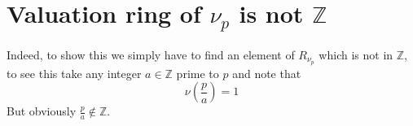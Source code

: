 \documentclass[11pt, a4paper]{article}
\begin{document}
\section*{Valuation ring of $\nu_p$ is not $ \mathbb{Z}$ }
Indeed, to show this we simply have to find an element of $ R_{ \nu_p }$ which is not in $ \mathbb{Z}$, to see this take any integer $a\in \mathbb{Z}$ prime to $p$ and note that
\[ 
\nu( \frac{p}{a}) = 1
\]
But obviously $\frac{p}{a}\notin \mathbb{Z} $.
\end{document}

